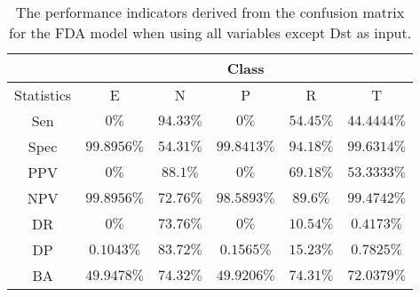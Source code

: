 \begin{table}[!ht]
	\centering
	\begin{tabular}{|c|c|c|c|c|c|}
		\hline
		 & \multicolumn{5}{c|}{Class} \\ \hline
		Statistics & E & N & P & R & T \\ \hline
		Sen & $0\%$ & $94.33\%$ & $0\%$ & $54.45\%$ & $44.4444\%$ \\ \hline
		Spec & $99.8956\%$ & $54.31\%$ & $99.8413\%$ & $94.18\%$ & $99.6314\%$ \\ \hline
		PPV & $0\%$ & $88.1\%$ & $0\%$ & $69.18\%$ & $53.3333\%$ \\ \hline
		NPV & $99.8956\%$ & $72.76\%$ & $98.5893\%$ & $89.6\%$ & $99.4742\%$ \\ \hline
		DR & $0\%$ & $73.76\%$ & $0\%$ & $10.54\%$ & $0.4173\%$ \\ \hline
		DP & $0.1043\%$ & $83.72\%$ & $0.1565\%$ & $15.23\%$ & $0.7825\%$ \\ \hline
		BA & $49.9478\%$ & $74.32\%$ & $49.9206\%$ & $74.31\%$ & $72.0379\%$ \\ \hline
	\end{tabular}
	\caption{The performance indicators derived from the confusion matrix for the FDA model when using all variables except Dst as input.}
	\label{tab:cs:reverse:noDst:fda}
\end{table}
